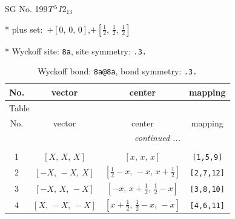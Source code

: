 \documentclass[fleqn,8pt]{jsarticle}
\begin{document}
\setcounter{MaxMatrixCols}{32}

\renewcommand{\tablename}{Table~}
\renewcommand{\figurename}{Figure~}
\begin{center}
\LARGE
SG No. 199\quad$T_{\rm }^{5}$\quad$I2_13$\quad[ cubic ]
\end{center}

* plus set:\,\,\,$+\left[ 0,\, 0,\, 0 \right]$,\quad $+\left[ \frac{1}{2},\, \frac{1}{2},\, \frac{1}{2} \right]$


* Wyckoff site: {\tt 8a}, site symmetry: {\tt .3.}
\renewcommand{\arraystretch}{1.2}
\begin{longtable}{cccc}
\caption{Wyckoff bond: {\tt 8a@8a}, bond symmetry: {\tt .3.}}
 \\
 \hline \hline
No. & vector & center & mapping \\ \hline \endfirsthead

\multicolumn{3}{l}{\tablename\ \thetable{}} \\
 \hline \hline
No. & vector & center & mapping \\ \hline \endhead

 \hline \hline
\multicolumn{3}{r}{\footnotesize\it continued ...} \\ \endfoot

 \hline \hline
\multicolumn{3}{r}{} \\ \endlastfoot

1 & $\left[ X,\, X,\, X \right]$ & $\left[ x,\, x,\, x \right]$ & {\tt [1,5,9]} \\ \hline
2 & $\left[ - X,\, - X,\, X \right]$ & $\left[ \frac{1}{2} - x,\, - x,\, x + \frac{1}{2} \right]$ & {\tt [2,7,12]} \\ \hline
3 & $\left[ - X,\, X,\, - X \right]$ & $\left[ - x,\, x + \frac{1}{2},\, \frac{1}{2} - x \right]$ & {\tt [3,8,10]} \\ \hline
4 & $\left[ X,\, - X,\, - X \right]$ & $\left[ x + \frac{1}{2},\, \frac{1}{2} - x,\, - x \right]$ & {\tt [4,6,11]} \\
\end{longtable}
\renewcommand{\arraystretch}{1.2}
\end{document}
